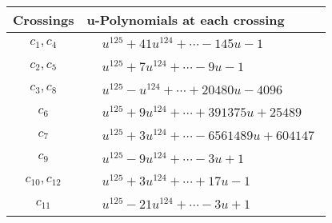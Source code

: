 \documentclass[1p]{elsarticle_modified}
\theoremstyle{definition}
\begin{document}
\begin{tabular}{m{50pt}|m{274pt}}
Crossings & \hspace{64pt}u-Polynomials at each crossing \\
\hline $$\begin{aligned}c_{1},c_{4}\end{aligned}$$&$\begin{aligned}
&u^{125}+41 u^{124}+\cdots-145 u-1
\end{aligned}$\\
\hline $$\begin{aligned}c_{2},c_{5}\end{aligned}$$&$\begin{aligned}
&u^{125}+7 u^{124}+\cdots-9 u-1
\end{aligned}$\\
\hline $$\begin{aligned}c_{3},c_{8}\end{aligned}$$&$\begin{aligned}
&u^{125}- u^{124}+\cdots+20480 u-4096
\end{aligned}$\\
\hline $$\begin{aligned}c_{6}\end{aligned}$$&$\begin{aligned}
&u^{125}+9 u^{124}+\cdots+391375 u+25489
\end{aligned}$\\
\hline $$\begin{aligned}c_{7}\end{aligned}$$&$\begin{aligned}
&u^{125}+3 u^{124}+\cdots-6561489 u+604147
\end{aligned}$\\
\hline $$\begin{aligned}c_{9}\end{aligned}$$&$\begin{aligned}
&u^{125}-9 u^{124}+\cdots-3 u+1
\end{aligned}$\\
\hline $$\begin{aligned}c_{10},c_{12}\end{aligned}$$&$\begin{aligned}
&u^{125}+3 u^{124}+\cdots+17 u-1
\end{aligned}$\\
\hline $$\begin{aligned}c_{11}\end{aligned}$$&$\begin{aligned}
&u^{125}-21 u^{124}+\cdots-3 u+1
\end{aligned}$\\
\hline
\end{tabular}\\~\\
\end{document}
